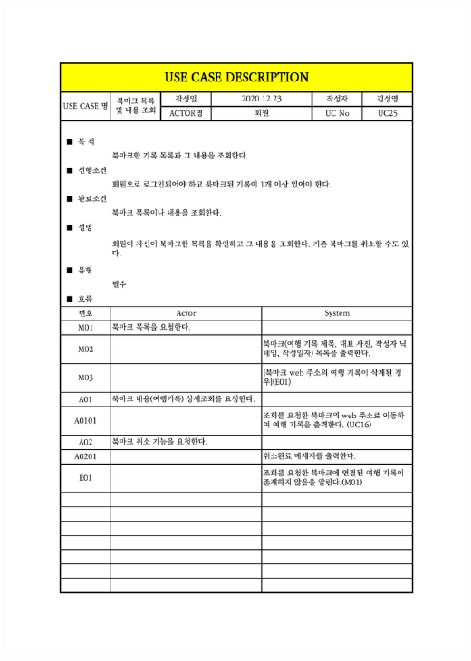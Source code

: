 {{{{{{{{{{{{{{{{{{{{{{{{{{{\includegraphics[width=1.1\textwidth]{./Figure/Design/Display/usecase/025.pdf} \\
}}}}}}}}}}}}}}}}}}}}}}}}}}}
